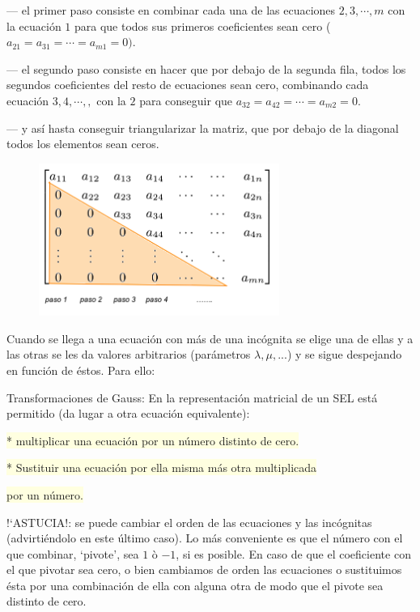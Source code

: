 --- el primer paso consiste en combinar cada una de las ecuaciones $2, 3, \cdots, m$ con la ecuación $1$ para que todos sus primeros coeficientes sean cero ($a_{21}=a_{31}=\cdots=a_{m1}=0)$.

--- el segundo paso consiste en hacer que por debajo de la segunda fila, todos los segundos coeficientes del resto de ecuaciones sean cero, combinando cada ecuación $3, 4, \cdots , ,$ con la $2$ para conseguir que $a_{32}=a_{42}=\cdots=a_{m2}=0$.

--- y así hasta conseguir triangularizar la matriz, que por debajo de la diagonal todos los elementos sean ceros. 
				
	\begin{figure}[H]
		\centering
		\includegraphics[width=0.7\textwidth]{imagenes/imagenes01/T01IM05.png}
	\end{figure}				
				
Cuando se llega a una ecuación con más de una incógnita se elige una de ellas y a las otras se les da valores arbitrarios (parámetros $\lambda, \mu, ...$) y se sigue despejando en función de éstos. Para ello:
				
\begin{teor}{Transformaciones de Gauss:} En la representación matricial de un SEL está permitido (da lugar a otra ecuación equivalente):
		
	\hspace{3mm} \colorbox{LightYellow}{* multiplicar una ecuación por un número distinto de cero.}
		
	\hspace{3mm}  \colorbox{LightYellow}{* Sustituir una ecuación por ella misma más otra  multiplicada} 
	
	\hspace{3mm} \colorbox{LightYellow}{ por un número.}
		
\noindent !`ASTUCIA!: se puede cambiar el orden de las ecuaciones y las incógnitas (advirtiéndolo en este último caso). Lo más conveniente es que el número con el que combinar, `pivote', sea $1$ ò $-1$, si es posible. En caso de que el coeficiente con el que pivotar sea cero, o bien cambiamos de orden las ecuaciones o sustituimos ésta por una combinación de ella con alguna otra de modo que el pivote sea distinto de cero.
\end{teor}



